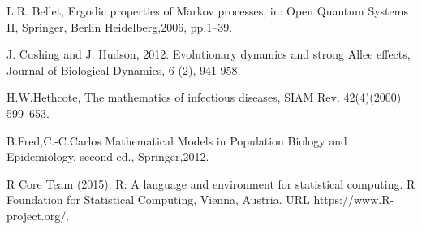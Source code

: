\begin{thebibliography}{00}
L.R. Bellet,
\newblock Ergodic properties of Markov processes, in: Open Quantum Systems II,
\newblock Springer, Berlin Heidelberg,2006, pp.1–39.

 J. Cushing and J. Hudson, 2012. 
\newblock Evolutionary dynamics and strong Allee effects,
\newblock Journal  of  Biological Dynamics, 6 (2), 941-958.

H.W.Hethcote,
\newblock The mathematics of infectious diseases,
\newblock SIAM Rev. 42(4)(2000) 599–653.

B.Fred,C.-C.Carlos
\newblock Mathematical Models in Population Biology and Epidemiology,
\newblock second ed., Springer,2012.


R Core Team (2015). 
\newblock R: A language and environment for statistical computing. R Foundation for Statistical Computing, Vienna, Austria.
\newblock URL https://www.R-project.org/.

\end{thebibliography}

